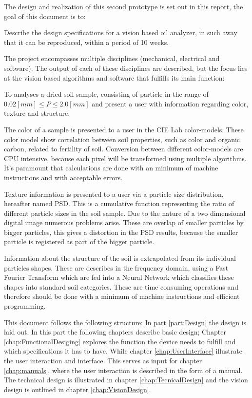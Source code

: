 \documentclass[11pt,fleqn,,a4paper,twoside,openright]{book}
\begin{document}
The design and realization of this second prototype is set out in this report, the goal of this document is to:
\begin{sBox}
	Describe the design specifications for a vision based oil analyzer, in such away that it can be reproduced, within a period of 10 weeks.
\end{sBox}
The project encompasses multiple disciplines (mechanical, electrical and software). The output of each of these disciplines are described, but the focus lies at the vision based algorithms and software that fulfills its main function:
\begin{sBox}
	To analyses a dried soil sample, consisting of particle in the range of $ 0.02 [mm] \leq P \leq 2.0 [mm] $ and present a user with information regarding color, texture and structure.
\end{sBox}

The color of a sample is presented to a user in the CIE Lab color-models. These color model show correlation between soil properties, such as color and organic carbon, related to fertility of soil. Conversion between different color-models are CPU intensive, because each pixel will be transformed using multiple algorithms. It's paramount that calculations are done with an minimum of machine instructions and with acceptable errors.

Texture information is presented to a user via a particle size distribution, hereafter named PSD. This is a cumulative function representing the ratio of different particle sizes in the soil sample. Due to the nature of a two dimensional digital image numerous problems arise. These are overlap of smaller particles by bigger particles, this gives a distortion in the PSD results, because the smaller particle is registered as part of the bigger particle.

Information about the structure of the soil is extrapolated from its individual particles shapes. These are describes in the frequency domain, using a Fast Fourier Transform which are fed into a Neural Network which classifies these shapes into standard soil categories. These are time consuming operations and therefore should be done with a minimum of machine instructions and efficient programming.

This document follows the following structure: In part \ref{part:Design} the design is laid out. In this part the following chapters describe basic design; Chapter \ref{chap:FunctionalDesiging} explores the function the device needs to fulfill and which specifications it has to have. While chapter \ref{chap:UserInterface} illustrate the user interaction and interface. This serves as input for chapter \ref{chap:manuals}, where the user interaction is described in the form of a manual. The technical design is illustrated in chapter \ref{chap:TecnicalDesign} and the vision design is outlined in chapter \ref{chap:VisionDesign}.
\end{document}
